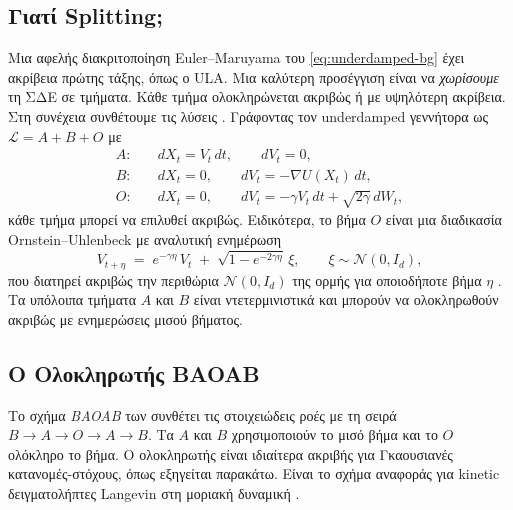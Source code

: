 \subsection{Γιατί Splitting;}
\label{sec:alg-splitting-motivation}

Μια αφελής διακριτοποίηση Euler--Maruyama του \eqref{eq:underdamped-bg} έχει
ακρίβεια πρώτης τάξης, όπως ο ULA. Μια καλύτερη προσέγγιση είναι να
\emph{χωρίσουμε} τη ΣΔΕ σε τμήματα. Κάθε τμήμα ολοκληρώνεται ακριβώς ή με
υψηλότερη ακρίβεια. Στη συνέχεια συνθέτουμε τις λύσεις
\citep{leimkuhler2015molecular}. Γράφοντας τον underdamped γεννήτορα ως
$\mathcal{L} = A + B + O$ με
\begin{align}
  A:\quad & dX_t = V_t\, dt, \qquad dV_t = 0,                              \tag{ολίσθηση στο $X$} \\
  B:\quad & dX_t = 0,         \qquad dV_t = -\nabla U(X_t)\, dt,           \tag{δύναμη στο $V$} \\
  O:\quad & dX_t = 0,         \qquad dV_t = -\gamma V_t\, dt + \sqrt{2\gamma}\, dW_t, \tag{Ornstein--Uhlenbeck στο $V$}
\end{align}
κάθε τμήμα μπορεί να επιλυθεί ακριβώς. Ειδικότερα, το βήμα $O$ είναι μια διαδικασία
Ornstein--Uhlenbeck με αναλυτική ενημέρωση
\begin{equation}
  V_{t+\eta} \;=\; e^{-\gamma \eta}\, V_t \;+\; \sqrt{1 - e^{-2\gamma\eta}}\, \xi,
  \qquad \xi \sim \mathcal{N}(0, I_d),
  \label{eq:ou-step}
\end{equation}
που διατηρεί ακριβώς την περιθώρια $\mathcal{N}(0, I_d)$ της ορμής για οποιοδήποτε
βήμα $\eta$ \citep{leimkuhler2013bao}. Τα υπόλοιπα τμήματα $A$ και $B$ είναι
ντετερμινιστικά και μπορούν να ολοκληρωθούν ακριβώς με ενημερώσεις μισού βήματος.

\subsection{Ο Ολοκληρωτής BAOAB}
\label{sec:alg-baoab}

Το σχήμα \emph{BAOAB} των \citet{leimkuhler2013bao} συνθέτει τις στοιχειώδεις
ροές με τη σειρά $B \to A \to O \to A \to B$. Τα $A$ και $B$ χρησιμοποιούν το μισό
βήμα και το $O$ ολόκληρο το βήμα. Ο ολοκληρωτής είναι ιδιαίτερα ακριβής για
Γκαουσιανές κατανομές-στόχους, όπως εξηγείται παρακάτω. Είναι το σχήμα αναφοράς
για kinetic δειγματολήπτες Langevin στη μοριακή δυναμική
\citep{leimkuhler2015molecular}.


